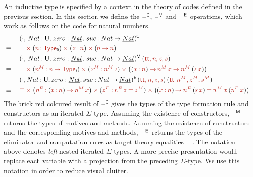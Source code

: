 \documentclass[a4paper,UKenglish]{lipics-v2018}
\newcommand{\U}{\mathsf{U}}
\newcommand{\ra}{\rightarrow}
\newcommand{\blank}{\mathord{\hspace{1pt}\text{--}\hspace{1pt}}} %
\newcommand{\C}{\mathsf{C}}
\newcommand{\M}{\mathsf{M}}
\newcommand{\1}{\mathsf{1}} \renewcommand{\Pr}{\mathsf{Pr}}
\renewcommand{\in}{\mathbin{\hat:}}
\renewcommand{\hat}[1]{{\color{BrickRed}{#1}}}
\newcommand{\rah}{\mathbin{\hat\ra}}
\newcommand{\commah}{\hat,\,}
\newcommand{\timesh}{\mathbin{\hat\times}}
\newcommand{\eqh}{\mathbin{\hat=}}
\renewcommand{\tt}{\hat{\mathsf{tt}}}
\newcommand{\Type}{\hat{\mathsf{Type}}}
\begin{document}
An inductive type is specified by a context in the theory of codes
defined in the previous section. In this section we define the
$\blank^\C$, $\blank^\M$ and $\blank^\E$ operations, which work as follows
on the code for natural numbers.
\begin{alignat*}{5}
  & && (\cdot,\,Nat : \U,\,zero:\underline{Nat},\,suc:Nat\ra\underline{Nat})^\C \\
  & \equiv \,\, && \hat{\top}\timesh(\hat{n}\in\Type_0)\timesh(\hat{z}\in \hat{n})\timesh(\hat{n}\rah \hat{n}) \\
  & && (\cdot,\,Nat : \U,\,zero:\underline{Nat},\,suc:Nat\ra\underline{Nat})^\M\,(\tt\commah\hat{n}\commah \hat{z}\commah \hat{s}) \\
  & \equiv \,\, && \hat{\top}\timesh(\hat{n^M}\in \hat{n} \rah \Type_{i})\timesh(\hat{z^M}\in \hat{n^M}\,\hat{z})\timesh \big((\hat{x}\in \hat{n})\rah  \hat{n^M}\,\hat{x}\rah  \hat{n^M}\,(\hat{s}\,\hat{x})\big) \\
  & && (\cdot,Nat : \U,zero:\underline{Nat},suc:Nat\ra\underline{Nat})^\E\,(\tt\commah \hat{n}\commah \hat{z}\commah \hat{s})\,(\tt\commah\hat{n^M}\commah \hat{z^M}\commah \hat{s^M}) \\
  & \equiv \,\, && \hat{\top}\timesh\big(\hat{n^E} \in (\hat{x}\in \hat{n})\rah  \hat{n^M}\,\hat{x}\big)\timesh(\hat{z^E} \in \hat{n^E}\,\hat{z}\eqh \hat{z^M}) \timesh \big((\hat{x}\in \hat{n})\rah  \hat{n^E}\,(\hat{s}\,\hat{x})\eqh \hat{n^M}\,\hat{x}\,(\hat{n^E}\,\hat{x})\big)
\end{alignat*}
The {\color{BrickRed}brick red} coloured result of $\blank^\C$ gives
the types of the type formation rule and constructors as an iterated
$\Sigma$-type. Assuming the existence of constructors, $\blank^\M$
returns the types of motives and methods. Assuming the existence of
constructors and the corresponding motives and methods, $\blank^\E$
returns the types of the eliminator and computation rules as target
theory equalities $\eqh$. The notation above denotes
\emph{left}-nested iterated $\Sigma$-types. A more precise
presentation would replace each variable with a projection from the
preceding $\Sigma$-type. We use this notation in order to reduce
visual clutter.
\end{document}
